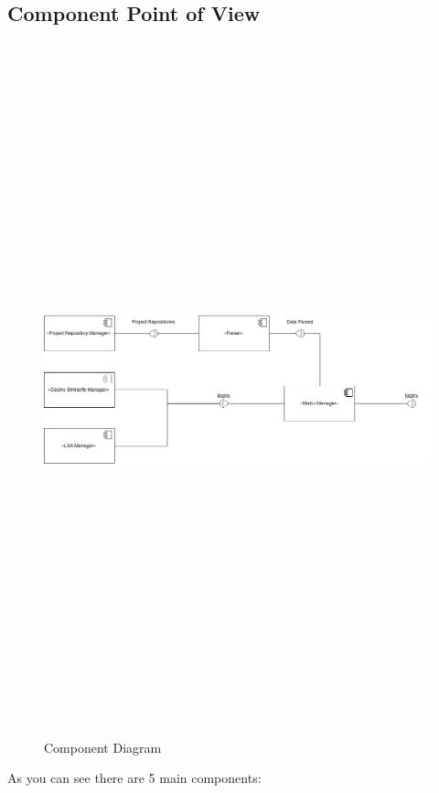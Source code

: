 \subsection{Component Point of View}
\begin{figure}[!h]
	\includegraphics[width=15cm,height=20cm,keepaspectratio]{images/ComponentDiagram.png}
	\caption{Component Diagram}
	\label{fig:Component}
\end{figure}
As you can see there are 5 main components:
